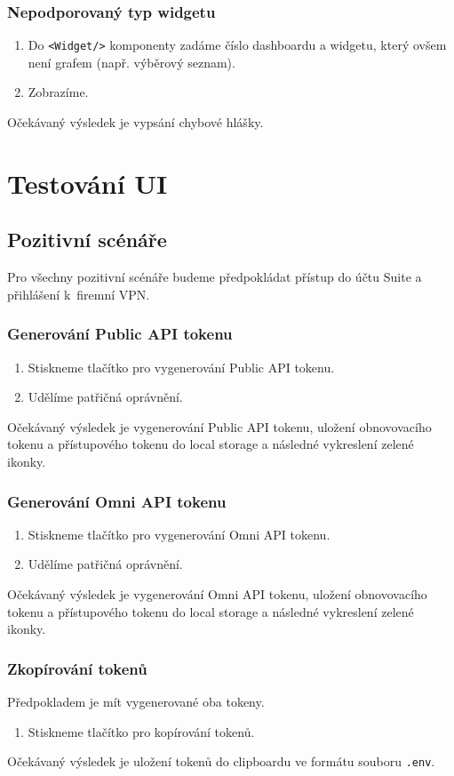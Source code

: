 \documentclass[czech, bc, kiv, he, iso690numb]{fasthesis}
\begin{document}
\subsubsection{Nepodporovaný typ widgetu}
\begin{enumerate}
	\item Do \texttt{<Widget/>} komponenty zadáme číslo dashboardu a widgetu, který ovšem není grafem (např. výběrový seznam).
	\item Zobrazíme.
\end{enumerate}
Očekávaný výsledek je vypsání chybové hlášky.

\section{Testování UI}
\subsection{Pozitivní scénáře}
Pro všechny pozitivní scénáře budeme předpokládat přístup do účtu Suite a přihlášení k~firemní VPN.
\subsubsection{Generování Public API tokenu}
\begin{enumerate}
	\item Stiskneme tlačítko pro vygenerování Public API tokenu.
	\item Udělíme patřičná oprávnění.
\end{enumerate}
Očekávaný výsledek je vygenerování Public API tokenu, uložení obnovovacího tokenu a přístupového tokenu do local storage a následné vykreslení zelené ikonky.

\subsubsection{Generování Omni API tokenu}
\begin{enumerate}
	\item Stiskneme tlačítko pro vygenerování Omni API tokenu.
	\item Udělíme patřičná oprávnění.
\end{enumerate}
Očekávaný výsledek je vygenerování Omni API tokenu, uložení obnovovacího tokenu a přístupového tokenu do local storage a následné vykreslení zelené ikonky.

\subsubsection{Zkopírování tokenů}
Předpokladem je mít vygenerované oba tokeny.
\begin{enumerate}
	\item Stiskneme tlačítko pro kopírování tokenů.
\end{enumerate}
Očekávaný výsledek je uložení tokenů do clipboardu ve formátu souboru \texttt{.env}.
\end{document}

